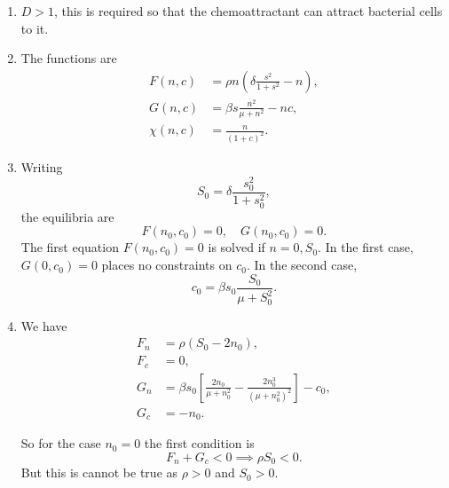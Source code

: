\documentclass[a4paper, 12pt]{article}
\begin{document}
\begin{enumerate}[label={\bf \arabic{*}.\;}, ref={\arabic{*}},itemsep=3ex, left=0ex]
{\begin{enumerate}
{            Finally the term
            \begin{equation}
              - \kappa n \frac{s^2}{1+s^2}
            \end{equation}
            represents the consumption of the nutrient $s$ by the bacteria, the $s$ dependence indicated the consumption per density element saturates (the bacterial cells can only consume so much nutrient in a given time frame).
          }
        \item{
            $D>1$, this is required so that the chemoattractant can attract bacterial cells to it.
          }
        \item{The functions are
            \begin{align}
              F(n,c) &=  \rho n \left(\delta\frac{s^2}{1+s^2} - n\right), \\
              G(n,c) &=  \beta s\frac{n^2}{\mu + n^2} - n c, \\
              \chi(n,c) & =\frac{n}{(1+c)^2}.
            \end{align}
          }
        \item{
            Writing
            \begin{equation}
              S_0= \delta\frac{s_0^2}{1+s_0^2},
            \end{equation}
            the equilibria are
            \begin{equation}
              F(n_0,c_0) =0,\quad G(n_0,c_0)=0.
            \end{equation}
            The first equation $F(n_0,c_0) =0$ is solved if $n=0,S_0$. In the first case, $G(0,c_0)=0$ places no constraints on $c_0$. In the second case,
            \begin{equation}
              c_0= \beta  s_0\frac{S_0}{\mu + S_0^2}.
            \end{equation}
          }
        \item{
            We have
            \begin{align}
              F_n &= \rho(S_0 - 2n_0),\\
              F_c &= 0, \\
              G_n &= \beta s_0 \left[\frac{2n_0}{\mu + n_0^2} - \frac{2 n_0^3}{(\mu + n_0^2)^2}\right]- c_0, \\
              G_c &= -n_0.
            \end{align}

            So for the case $n_0=0$ the first condition is
            \begin{equation}
              F_n + G_c <0 \implies \rho S_0 <0.
            \end{equation}
            But this is cannot be true as $\rho>0$ and $S_0>0$.

}
\end{enumerate}}
\end{enumerate}
\end{document}
